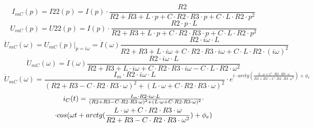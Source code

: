 \documentclass[a4paper,12pt]{article}
\begin{document}
$$I_{mC}(p)=I22(p)=I(p)\cdot \frac{R2}{R2+R3+L\cdot p+C\cdot R2\cdot R3\cdot p+C\cdot L\cdot R2\cdot p^2}$$
$$U_{mC}(p)=U22(p)=I(p)\cdot \frac{R2\cdot p\cdot L}{R2+R3+L\cdot p+C\cdot R2\cdot R3\cdot p+C\cdot L\cdot R2\cdot p^2}$$
$$\dot{U}_{mC}(\omega) = U_{mC}(p)\vert_{p=i\omega}=\dot{I}(\omega)\frac{R2\cdot i\omega\cdot L}{R2+R3+L\cdot {i\omega}+C\cdot R2\cdot R3\cdot {i\omega}+C\cdot L\cdot R2\cdot (i\omega)^2}$$
$$\dot{U}_{mC}(\omega) =\dot{I}(\omega)\frac{R2\cdot i\omega\cdot L}{R2+R3+L\cdot {i\omega}+C\cdot R2\cdot R3\cdot {i\omega}-C\cdot L\cdot R2\cdot \omega^2}$$
$$\dot{U}_{mC}(\omega) =\frac{I_m\cdot R2\cdot i\omega\cdot L}{(R2+R3-C\cdot R2\cdot R3\cdot \omega)^2+(L\cdot \omega+C\cdot R2\cdot R3\cdot \omega)^2}\cdot e^{i\cdot arctg(\frac{L\cdot \omega+C\cdot R2\cdot R3\cdot \omega}{R2+R3-C\cdot R2\cdot R3\cdot \omega^2})+\phi_e}$$
\begin{multline}
$$i_{C}(t) =\frac{I_m\cdot R2\cdot i\omega\cdot L}{(R2+R3-C\cdot R2\cdot R3\cdot \omega)^2+(L\cdot \omega+C\cdot R2\cdot R3\cdot \omega)^2}\cdot \\* \cdot cos(\omega t + arctg(\frac{L\cdot \omega+C\cdot R2\cdot R3\cdot \omega}{R2+R3-C\cdot R2\cdot R3\cdot \omega^2})+\phi_e)$$
\end{multline}
\end{document}
